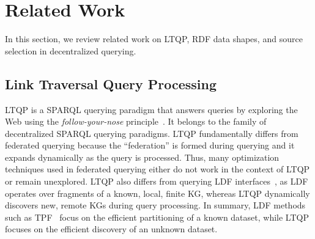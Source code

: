 \section{Related Work}\label{sec:related_work}

In this section, we review related work on \ac{LTQP}, \ac{RDF} data shapes, and source selection in decentralized querying.

\subsection{Link Traversal Query Processing}
\ac{LTQP} is a SPARQL querying paradigm that answers queries by exploring the Web using the \textit{follow-your-nose} principle~\cite{hartig2016walking}.
It belongs to the family of decentralized SPARQL querying paradigms.
\ac{LTQP} fundamentally differs from federated querying because the ``federation'' is formed during querying and it expands dynamically as the query is processed.
Thus, many optimization techniques used in federated querying either do not work in the context of \ac{LTQP} or remain unexplored.
\ac{LTQP} also differs from querying \ac{LDF} interfaces~\cite{azzam2020smart,azzam2021wisekg,DBLP:journals/corr/HartigA16}, as \ac{LDF} operates over fragments of a known, local, finite \ac{KG}, whereas \ac{LTQP} dynamically discovers new, remote \acp{KG} during query processing.
In summary, \ac{LDF} methods such as \ac{TPF}~\cite{verborgh2016triple} focus on the efficient partitioning of a known dataset, while \ac{LTQP} focuses on the efficient discovery of an unknown dataset.



